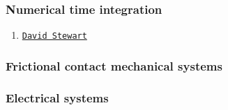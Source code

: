 \hypertarget{scientificComputing_sdns_4}{}\subsubsection{Numerical time integration}\label{scientificComputing_sdns_4}
\begin{enumerate}
\item \href{http://www.math.uiowa.edu/%7Edstewart/}{\tt David Stewart}\end{enumerate}
\hypertarget{scientificComputing_sdns_5}{}\subsubsection{Frictional contact mechanical systems}\label{scientificComputing_sdns_5}
\hypertarget{scientificComputing_sdns_6}{}\subsubsection{Electrical systems}\label{scientificComputing_sdns_6}
